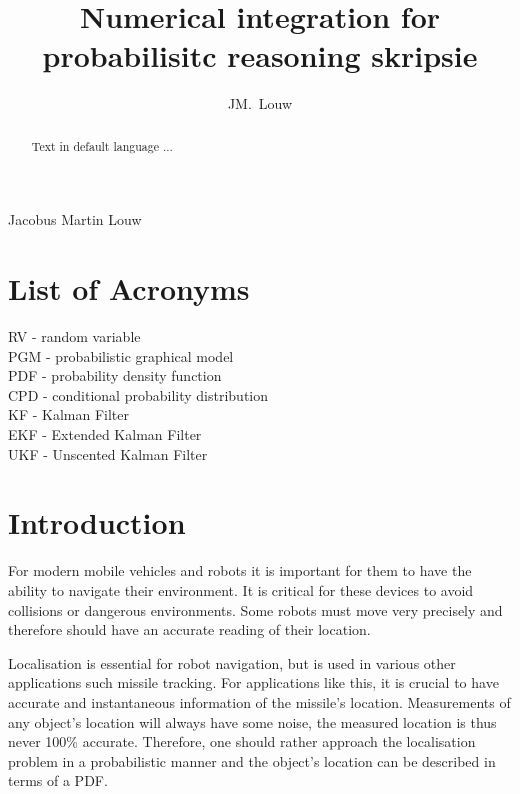 \documentclass[12pt,oneside,openany,a4paper, %
afrikaans,english,
]{memoir}
\numberwithin{equation}{chapter}
\newcommand*{\WaterMark}[2][0.15\paperwidth]{%
\AddToShipoutPicture*{\AtTextCenter{%
\parbox[c]{0pt}{\makebox[0pt][c]{%
\texttt{[image: \#2]}}}}}}
\begin{document}
\pagestyle{plain}
\frontmatter
\title{Numerical integration for probabilisitc reasoning skripsie}
\author{JM.\ Louw}{Jacobus Martin Louw}
\frontmatter
\WaterMark{UScrest-WM}
\TitlePage

\DeclarationPage

\address{Department of Electrical and Electronic Engineering,\\
University of Stellenbosch,\\
Private Bag X1, 7602 Matieland, South Africa.}
\newpage

\tableofcontents
{}
\pagebreak
\listoffigures

\chapter{List of Acronyms}
RV -	random variable\\
PGM		-	probabilistic graphical model\\
PDF		-	probability density function\\
CPD		-	conditional probability distribution\\
KF		-	Kalman Filter\\
EKF		-	Extended Kalman Filter\\
UKF		-	Unscented Kalman Filter\\

\begin{abstract}
Text in default language ...
\end{abstract}


\mainmatter
\chapter{Introduction}
For modern mobile vehicles and robots it is important for them to have the ability to navigate their environment. It is critical for these devices to avoid collisions or dangerous environments. Some robots must move very precisely and therefore should have an accurate reading of their location.

Localisation is essential for robot navigation, but is used in various other applications such missile tracking. For applications like this, it is crucial to have accurate and instantaneous information of the missile's location. Measurements of any object's location will always have some noise,  the measured location is thus never 100\% accurate. Therefore, one should rather approach the localisation problem in a probabilistic manner and the object's location can be described in terms of a PDF.
\end{document}
